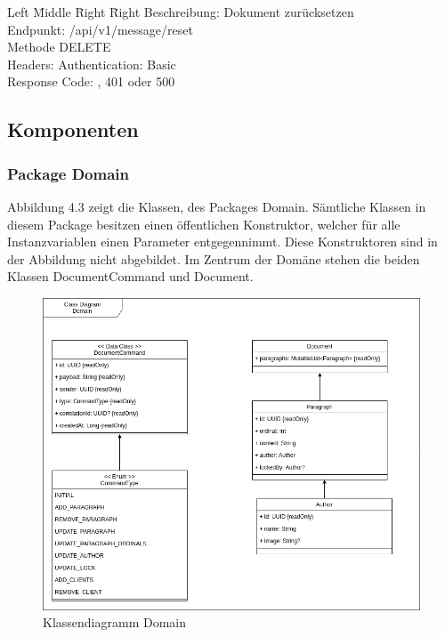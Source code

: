 \begin{tabbing}
    Left \= Middle \= Right \= Right \kill
    Beschreibung:  \> \> \> Dokument zurücksetzen \\
    Endpunkt:  \> \> \> /api/v1/message/reset\\
    Methode \>  \> \> DELETE\\
    Headers:  \> \>   \> Authentication: Basic\\
    Response Code:  \> \>  , 401 oder 500 \\
\end{tabbing}

\clearpage

\subsection{Komponenten}\label{subsec:komponenten}

\subsubsection{Package Domain}

Abbildung 4.3 zeigt die Klassen, des Packages Domain.
Sämtliche Klassen in diesem Package besitzen einen öffentlichen Konstruktor, welcher für alle Instanzvariablen einen Parameter entgegennimmt.
Diese Konstruktoren sind in der Abbildung nicht abgebildet.
Im Zentrum der Domäne stehen die beiden Klassen DocumentCommand und Document.

\begin{figure}[h]
    \centering
    \begin{minipage}[b]{0.8\textwidth}
        \includegraphics[width=\textwidth]{images/class-be-domain.drawio}
        \caption{Klassendiagramm Domain}
    \end{minipage}
\end{figure}

